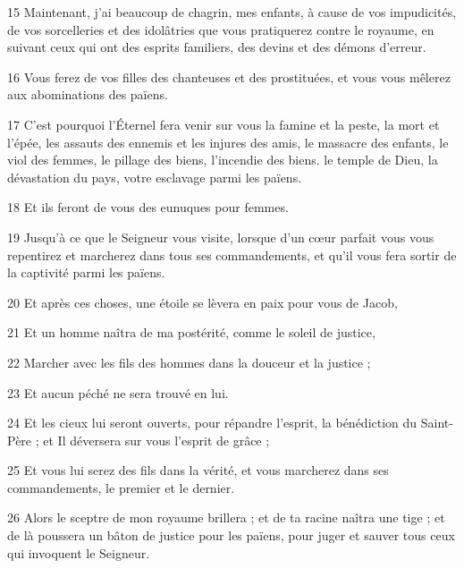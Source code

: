\par 15 Maintenant, j'ai beaucoup de chagrin, mes enfants, à cause de vos impudicités, de vos sorcelleries et des idolâtries que vous pratiquerez contre le royaume, en suivant ceux qui ont des esprits familiers, des devins et des démons d'erreur.

\par 16 Vous ferez de vos filles des chanteuses et des prostituées, et vous vous mêlerez aux abominations des païens.

\par 17 C'est pourquoi l'Éternel fera venir sur vous la famine et la peste, la mort et l'épée, les assauts des ennemis et les injures des amis, le massacre des enfants, le viol des femmes, le pillage des biens, l'incendie des biens. le temple de Dieu, la dévastation du pays, votre esclavage parmi les païens.

\par 18 Et ils feront de vous des eunuques pour femmes.

\par 19 Jusqu'à ce que le Seigneur vous visite, lorsque d'un cœur parfait vous vous repentirez et marcherez dans tous ses commandements, et qu'il vous fera sortir de la captivité parmi les païens.

\par 20 Et après ces choses, une étoile se lèvera en paix pour vous de Jacob,

\par 21 Et un homme naîtra de ma postérité, comme le soleil de justice,

\par 22 Marcher avec les fils des hommes dans la douceur et la justice ;

\par 23 Et aucun péché ne sera trouvé en lui.

\par 24 Et les cieux lui seront ouverts, pour répandre l'esprit, la bénédiction du Saint-Père ; et Il déversera sur vous l'esprit de grâce ;

\par 25 Et vous lui serez des fils dans la vérité, et vous marcherez dans ses commandements, le premier et le dernier.

\par 26 Alors le sceptre de mon royaume brillera ; et de ta racine naîtra une tige ; et de là poussera un bâton de justice pour les païens, pour juger et sauver tous ceux qui invoquent le Seigneur.

